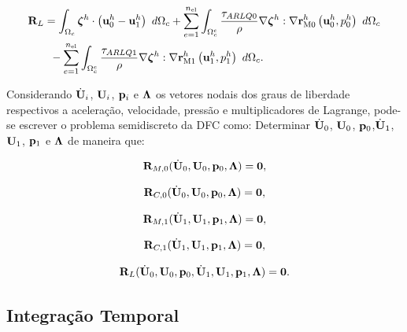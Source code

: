 \documentclass[tese_patricia]{subfiles}
\begin{document}
\begin{align}
	\begin{split}
		&\mathbf{R}_{L} = \int_{\Omega_{c}}  \boldsymbol{\zeta}^h  \cdot \left(\mathbf{u}_0^h - \mathbf{u}_1^h \right) \ d\Omega_{c} + \sum_{e=1}^{n_{\mathrm{el}}} \int_{\Omega^e_{c}} \frac{\tau_{ARLQ0}}{\rho} \nabla \boldsymbol{\zeta}^h : \nabla \mathbf{r}_{\mathrm{M0}}^{h}\left(\mathbf{u}_0^h,p_0^h\right) \ d\Omega_{c}\\
		&\qquad - \sum_{e=1}^{n_{\mathrm{el}}} \int_{\Omega^e_{c}} \frac{\tau_{ARLQ1}}{\rho} \nabla \boldsymbol{\zeta}^h : \nabla \mathbf{r}_{\mathrm{M1}}^{h}\left(\mathbf{u}_1^h,p_1^h\right) \ d\Omega_{c}.
		\label{eq:ResidualLagrange}
	\end{split}
\end{align}

Considerando $\dot{\mathbf{U}}_{i}$, $\mathbf{U}_{i}$, $\mathbf{p}_i$ e $\boldsymbol{\Lambda}$ os vetores nodais dos graus de liberdade respectivos a aceleração, velocidade, pressão e multiplicadores de Lagrange, pode-se escrever o problema semidiscreto da DFC como: Determinar $\dot{\mathbf{U}}_0$, $\mathbf{U}_0$, $\mathbf{p}_0$,$\dot{\mathbf{U}}_1$, $\mathbf{U}_1$, $\mathbf{p}_1$ e $\boldsymbol{\Lambda}$ de maneira que:

\begin{align}
	\mathbf{R}_{M,0}(\dot{\mathbf{U}}_0,\mathbf{U}_0,\mathbf{p}_0,\boldsymbol{\Lambda}) = \mathbf{0}, \label{eq:NLinear1}
\end{align}

\begin{align}
	\mathbf{R}_{C,0}(\dot{\mathbf{U}}_0,\mathbf{U}_0,\mathbf{p}_0,\boldsymbol{\Lambda}) = \mathbf{0},
\end{align}

\begin{align}
	\mathbf{R}_{M,1}(\dot{\mathbf{U}}_1,\mathbf{U}_1,\mathbf{p}_1,\boldsymbol{\Lambda}) = \mathbf{0},
\end{align}

\begin{align}
	\mathbf{R}_{C,1}(\dot{\mathbf{U}}_1,\mathbf{U}_1,\mathbf{p}_1,\boldsymbol{\Lambda}) = \mathbf{0},
\end{align}

\begin{align}
	\mathbf{R}_{L}(\dot{\mathbf{U}}_0,\mathbf{U}_0,\mathbf{p}_0,\dot{\mathbf{U}}_1,\mathbf{U}_1,\mathbf{p}_1,\boldsymbol{\Lambda}) = \mathbf{0}. \label{eq:NLinear5}
\end{align}


\subsection{Integração Temporal}
\end{document}
